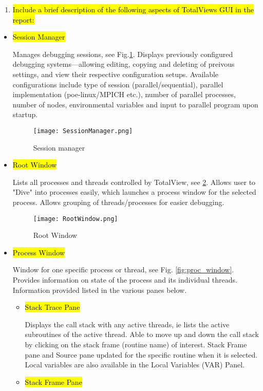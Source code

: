 \documentclass{article}
\begin{document}
	\begin{enumerate}
	

	\item \hl{Include a brief description of the following aspects of TotalViews GUI in the report:}
	\end{enumerate}
	\begin{itemize}
	\item \hl{Session Manager}
	
	Manages debugging sessions, see Fig.\ref{fig:sess_manager}. 
	Displays previously configured debugging systems---allowing editing, copying and deleting of preivous settings, and view their respective configuration setups. 
	Available configurations include type of session (parallel/sequential), parallel implementation (poe-linux/MPICH etc.), number of parallel processes, number of nodes, environmental variables and input to parallel program upon startup.
	\begin{figure}[p] %
		\begin{center}	
		\texttt{[image: SessionManager.png]}
		\caption{Session manager}
		\label{fig:sess_manager}
		\end{center}
	\end{figure}
	\item \hl{Root Window}
	
	Lists all processes and threads controlled by TotalView, see \ref{fig:root_window}. 
	Allows user to "Dive" into processes easily, which launches a process window for the selected process.
	Allows grouping of threads/processes for easier debugging.
	\begin{figure}[p] %
	\begin{center}
			\texttt{[image: RootWindow.png]}
		\caption{Root Window}
		\label{fig:root_window}
	\end{center}
	\end{figure}
	\item \hl{Process Window}
	
	Window for one specific process or thread, see Fig. \ref{fig:proc_window}. 
	Provides information on state of the process and its individual threads. 
	Information provided listed in the various panes below.
	\begin{itemize}
		\item \hl{Stack Trace Pane}
		
		Displays the call stack with any active threads, ie lists the active subroutines of the active thread. 
		Able to move up and down the call stack by clicking on the stack frame (routine name) of interest.
		Stack Frame pane and Source pane updated for the specific routine when it is selected. 
		Local variables are also available in the Local Variables (VAR) Panel.
		\item \hl{Stack Frame Pane}
		

\end{itemize}
\end{itemize}
\end{document}
